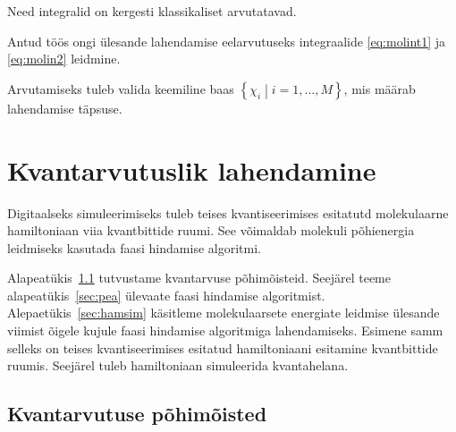 \documentclass[12pt]{report}
\def\cparen#1{\left\{#1\right\}}
\newcommand{\comment}[1]{}
\begin{document}
Need integralid on kergesti klassikaliset arvutatavad.

Antud töös ongi ülesande lahendamise eelarvutuseks integraalide \eqref{eq:molint1} ja \eqref{eq:molin2} leidmine.

Arvutamiseks tuleb valida keemiline baas \(\cparen{\chi_i \middle| i=1,\ldots, M}\), mis määrab lahendamise täpsuse.

\chapter{Kvantarvutuslik lahendamine}\label{chap:qcomp}

\comment{
Digitaalseks simuleerimiseks tuleb Focki ruumi hamiltoniaan esitada kvantbittide ruumis.
Edasi saab molekulaarsete energiate leidmiseks kasutada faasi hindamise algoritmi, mis on tegelikult lahendamisviis märksa üldisema ülesande joaks.

Alapeatükis~\ref{sec:qubits} tuvustame kvantarvuse põhimõisteid.

Järgmisena, alapeatükis~\ref{sec:pea}, tutvustame faasi hindamise algoritmi üldiselt.

Alles hiljem, alepaetükis~\ref{sec:hamsim}, käsitleme molekulaarsete energiate leidmise ülesande viimist õigele kujule faasi hindamise algoritmiga lahendamiseks.
Esimene samm selleks on Focki ruumi hamiltoniaani esitamine kvantbittide ruumis.
Teine samm on hamiltoniaani simuleerimine kvantahelana, milleks tuleb hermiitilise operaatorit puudutav ülesanne kodeerida unitaarsete operaatorite kaudu.
}


Digitaalseks simuleerimiseks tuleb teises kvantiseerimises esitatutd molekulaarne hamiltoniaan viia kvantbittide ruumi.
See võimaldab molekuli põhienergia leidmiseks kasutada faasi hindamise algoritmi. 

Alapeatükis~\ref{sec:qubits} tutvustame kvantarvuse põhimõisteid. Seejärel teeme alapeatükis~\ref{sec:pea} ülevaate faasi hindamise algoritmist. Alepaetükis~\ref{sec:hamsim} käsitleme molekulaarsete energiate leidmise ülesande viimist õigele kujule faasi hindamise algoritmiga lahendamiseks.
Esimene samm selleks on teises kvantiseerimises esitatud hamiltoniaani esitamine kvantbittide ruumis. Seejärel tuleb  hamiltoniaan simuleerida kvantahelana.


\section{Kvantarvutuse põhimõisted}\label{sec:qubits}
\end{document}
